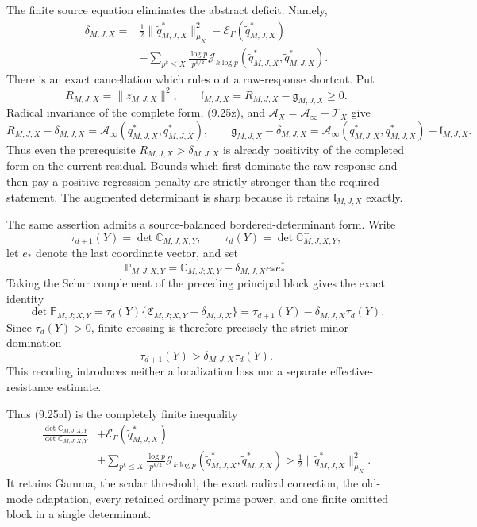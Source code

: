 \documentclass[11pt]{amsart}
\theoremstyle{definition}
\theoremstyle{remark}
\begin{document}
The finite source equation eliminates the abstract deficit.  Namely,
\[
\boxed{
\begin{aligned}
 \delta_{M,J,X}={}&\frac12\|\widetilde q_{M,J,X}^*\|_{\mu_K}^2
 -\mathscr E_\Gamma(\widetilde q_{M,J,X}^*)\\
 &-\sum_{p^k\le X}\frac{\log p}{p^{k/2}}
 \mathcal J_{k\log p}(\widetilde q_{M,J,X}^*,
                       \widetilde q_{M,J,X}^*).
\end{aligned}}
\tag{9.25am}
\]
There is an exact cancellation which rules out a raw-response shortcut.
Put
\[
 R_{M,J,X}=\|z_{M,J,X}\|^2,
 \qquad
 \mathfrak l_{M,J,X}=R_{M,J,X}-\mathfrak g_{M,J,X}\ge0.
\]
Radical invariance of the complete form, (9.25z), and
\(\mathcal A_X=\mathcal A_\infty-\mathcal T_X\) give
\[
 \boxed{
 R_{M,J,X}-\delta_{M,J,X}
 =\mathcal A_\infty(q_{M,J,X}^*,q_{M,J,X}^*),
 \qquad
 \mathfrak g_{M,J,X}-\delta_{M,J,X}
 =\mathcal A_\infty(q_{M,J,X}^*,q_{M,J,X}^*)
  -\mathfrak l_{M,J,X}.}
\tag{9.25an}
\]
Thus even the prerequisite \(R_{M,J,X}>\delta_{M,J,X}\) is already
positivity of the completed form on the current residual.  Bounds which
first dominate the raw response and then pay a positive regression penalty
are strictly stronger than the required statement.  The augmented
determinant is sharp because it retains \(\mathfrak l_{M,J,X}\) exactly.

The same assertion admits a source-balanced bordered-determinant form.
Write
\[
 \tau_{d+1}(Y)=\det\mathbb C_{M,J;X,Y},\qquad
 \tau_d(Y)=\det\mathbb C_{M,J;X,Y}^{-},
\]
let \(e_*\) denote the last coordinate vector, and set
\[
 \mathbb P_{M,J;X,Y}
 =\mathbb C_{M,J;X,Y}
  -\delta_{M,J,X}e_*e_*^*.
\]
Taking the Schur complement of the preceding principal block gives the
exact identity
\[
 \boxed{
 \det\mathbb P_{M,J;X,Y}
 =\tau_d(Y)\{
   \mathfrak C_{M,J;X,Y}-\delta_{M,J,X}\}
 =\tau_{d+1}(Y)-\delta_{M,J,X}\tau_d(Y).}
\]
Since \(\tau_d(Y)>0\), finite crossing is therefore precisely the strict
minor domination
\[
 \boxed{\tau_{d+1}(Y)>\delta_{M,J,X}\tau_d(Y).}
\]
This recoding introduces neither a localization loss nor a separate
effective-resistance estimate.

Thus (9.25al) is the completely finite inequality
\[
\begin{aligned}
 \frac{\det\mathbb C_{M,J;X,Y}}
      {\det\mathbb C_{M,J;X,Y}^{-}}
 &+\mathscr E_\Gamma(\widetilde q_{M,J,X}^*)\\
 &+\sum_{p^k\le X}\frac{\log p}{p^{k/2}}
 \mathcal J_{k\log p}(\widetilde q_{M,J,X}^*,
                       \widetilde q_{M,J,X}^*)
 >\frac12\|\widetilde q_{M,J,X}^*\|_{\mu_K}^2.
\end{aligned}
\tag{9.25ao}
\]
It retains Gamma, the scalar threshold, the exact radical correction, the
old-mode adaptation, every retained ordinary prime power, and one finite
omitted block in a single determinant.
\end{document}
